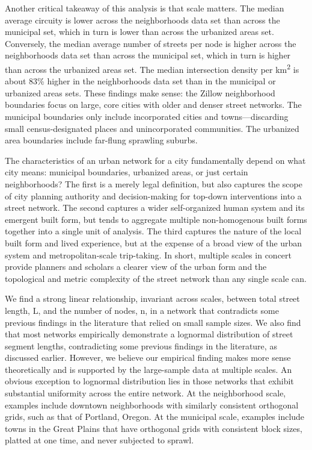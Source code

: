 \documentclass[Afour,sageh,times]{sage/sagej}
\begin{document}
Another critical takeaway of this analysis is that scale matters. The median average circuity is lower across the neighborhoods data set than across the municipal set, which in turn is lower than across the urbanized areas set. Conversely, the median average number of streets per node is higher across the neighborhoods data set than across the municipal set, which in turn is higher than across the urbanized areas set. The median intersection density per km\textsuperscript{2} is about 83\% higher in the neighborhoods data set than in the municipal or urbanized areas sets. These findings make sense: the Zillow neighborhood boundaries focus on large, core cities with older and denser street networks. The municipal boundaries only include incorporated cities and towns---discarding small census-designated places and unincorporated communities. The urbanized area boundaries include far-flung sprawling suburbs.

The characteristics of an urban network for a city fundamentally depend on what city means: municipal boundaries, urbanized areas, or just certain neighborhoods? The first is a merely legal definition, but also captures the scope of city planning authority and decision-making for top-down interventions into a street network. The second captures a wider self-organized human system and its emergent built form, but tends to aggregate multiple non-homogenous built forms together into a single unit of analysis. The third captures the nature of the local built form and lived experience, but at the expense of a broad view of the urban system and metropolitan-scale trip-taking. In short, multiple scales in concert provide planners and scholars a clearer view of the urban form and the topological and metric complexity of the street network than any single scale can.

We find a strong linear relationship, invariant across scales, between total street length, L, and the number of nodes, n, in a network that contradicts some previous findings in the literature that relied on small sample sizes. We also find that most networks empirically demonstrate a lognormal distribution of street segment lengths, contradicting some previous findings in the literature, as discussed earlier. However, we believe our empirical finding makes more sense theoretically and is supported by the large-sample data at multiple scales. An obvious exception to lognormal distribution lies in those networks that exhibit substantial uniformity across the entire network. At the neighborhood scale, examples include downtown neighborhoods with similarly consistent orthogonal grids, such as that of Portland, Oregon. At the municipal scale, examples include towns in the Great Plains that have orthogonal grids with consistent block sizes, platted at one time, and never subjected to sprawl. 
\end{document}
